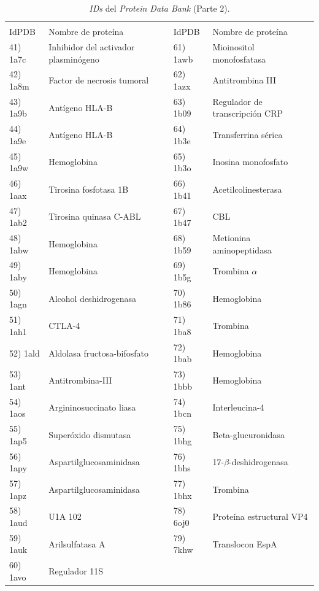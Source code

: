  	 \begin{table}[h!]
 	 	\centering
 	 	\begin{tabular}{ll|ll}
 	 		\multicolumn{4}{c}{} \\
 	 		IdPDB & Nombre de prote\'{i}na & IdPDB & Nombre de prote\'{i}na \\
 	 		\hline
 	 		41) 1a7c & Inhibidor del activador plasminógeno & 61) 1awb & Mioinositol monofosfatasa \\
 	 		42) 1a8m & Factor de necrosis tumoral & 62) 1azx & Antitrombina III \\
 	 		43) 1a9b & Antígeno HLA-B & 63) 1b09 & Regulador de transcripción CRP \\
 	 		44) 1a9e & Antígeno HLA-B & 64) 1b3e & Transferrina sérica \\
 	 		45) 1a9w & Hemoglobina & 65) 1b3o & Inosina monofosfato \\
 	 		46) 1aax & Tirosina fosfotasa 1B & 66) 1b41 & Acetilcolinesterasa \\
 	 		47) 1ab2 & Tirosina quinasa C-ABL & 67) 1b47 & CBL \\
 	 		48) 1abw & Hemoglobina & 68) 1b59 & Metionina aminopeptidasa \\
 	 		49) 1aby & Hemoglobina & 69) 1b5g & Trombina $\alpha$ \\
 	 		50) 1agn & Alcohol deshidrogenasa & 70) 1b86 & Hemoglobina \\
 	 		51) 1ah1 & CTLA-4 & 71) 1ba8 & Trombina \\
 	 		52) 1ald & Aldolasa fructosa-bifosfato & 72) 1bab & Hemoglobina \\
 	 		53) 1ant & Antitrombina-III & 73) 1bbb & Hemoglobina \\
 	 		54) 1aos & Argininosuccinato liasa & 74) 1bcn & Interleucina-4 \\
 	 		55) 1ap5 & Superóxido dismutasa & 75) 1bhg & Beta-glucuronidasa \\
 	 		56) 1apy & Aspartilglucosaminidasa & 76) 1bhs & 17-$\beta$-deshidrogenasa \\
 	 		57) 1apz & Aspartilglucosaminidasa & 77) 1bhx & Trombina \\
 	 		58) 1aud & U1A 102 & 78) 6oj0 & Proteína estructural VP4 \\
 	 		59) 1auk & Arilsulfatasa A & 79) 7khw & Translocon EspA	\\
 	 		60) 1avo & Regulador 11S & & \\
 	 		\hline
 	 	\end{tabular}
 	 	\caption{\emph{IDs} del \emph{Protein Data Bank} (Parte 2).}
 	 	\label{Tabla:ids79(2)}
 	 \end{table}
 	

